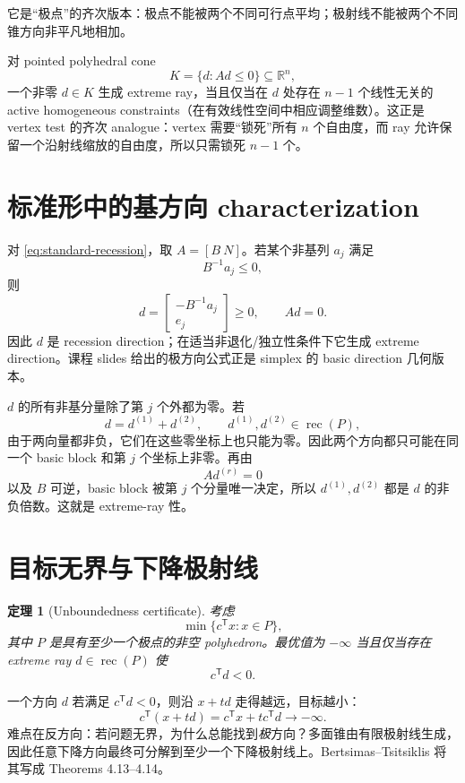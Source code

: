 \documentclass[11pt,a4paper,openany]{ctexrep}
\newtheorem{theorem}{定理}[chapter]
\theoremstyle{definition}
\newcommand{\R}{\mathbb{R}}
\newcommand{\rec}{\operatorname{rec}}
\newcommand{\transpose}{\mathsf{T}}
\begin{document}
它是“极点”的齐次版本：极点不能被两个不同可行点平均；极射线不能被两个不同锥方向非平凡地相加。


对 pointed polyhedral cone
\[
K=\{d:Ad\le0\}\subseteq\R^n,
\]
一个非零 $d\in K$ 生成 extreme ray，当且仅当在 $d$ 处存在 $n-1$ 个线性无关的 active homogeneous constraints（在有效线性空间中相应调整维数）。这正是 vertex test 的齐次 analogue：vertex 需要“锁死”所有 $n$ 个自由度，而 ray 允许保留一个沿射线缩放的自由度，所以只需锁死 $n-1$ 个。

\section{标准形中的基方向 characterization}
对 \eqref{eq:standard-recession}，取 $A=[B\ N]$。若某个非基列 $a_j$ 满足
\[
B^{-1}a_j\le0,
\]
则
\[
d=
\begin{bmatrix}
-B^{-1}a_j\\ e_j
\end{bmatrix}\ge0,
\qquad Ad=0.
\]
因此 $d$ 是 recession direction；在适当非退化/独立性条件下它生成 extreme direction。课程 slides 给出的极方向公式正是 simplex 的 basic direction 几何版本。


\begin{proofmap}
$d$ 的所有非基分量除了第 $j$ 个外都为零。若
\[
d=d^{(1)}+d^{(2)},\qquad d^{(1)},d^{(2)}\in\rec(P),
\]
由于两向量都非负，它们在这些零坐标上也只能为零。因此两个方向都只可能在同一个 basic block 和第 $j$ 个坐标上非零。再由
\[
Ad^{(r)}=0
\]
以及 $B$ 可逆，basic block 被第 $j$ 个分量唯一决定，所以 $d^{(1)},d^{(2)}$ 都是 $d$ 的非负倍数。这就是 extreme-ray 性。
\end{proofmap}

\section{目标无界与下降极射线}

\begin{theorem}[Unboundedness certificate]
考虑
\[
\min\{c^\transpose x:x\in P\},
\]
其中 $P$ 是具有至少一个极点的非空 polyhedron。最优值为 $-\infty$ 当且仅当存在 extreme ray $d\in\rec(P)$ 使
\[
c^\transpose d<0.
\]
\end{theorem}

一个方向 $d$ 若满足 $c^\transpose d<0$，则沿 $x+td$ 走得越远，目标越小：
\[
c^\transpose(x+td)=c^\transpose x+t c^\transpose d\to-\infty.
\]
难点在反方向：若问题无界，为什么总能找到\emph{极}方向？多面锥由有限极射线生成，因此任意下降方向最终可分解到至少一个下降极射线上。Bertsimas--Tsitsiklis 将其写成 Theorems 4.13--4.14。\cite[\S4.8]{bertsimas}
\end{document}
